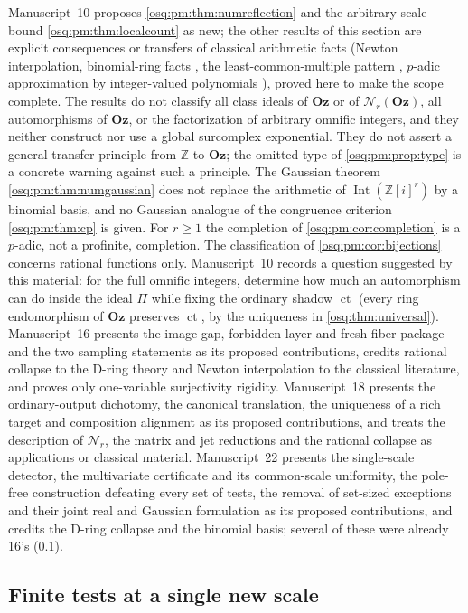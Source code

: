 \documentclass[11pt,letterpaper]{article}
\numberwithin{equation}{section}
\theoremstyle{definition}
\theoremstyle{remark}
\theoremstyle{plain}
\newcommand{\Oz}{\mathbf{Oz}}
\newcommand{\Z}{\mathbb Z}
\newcommand{\ct}{\operatorname{ct}}
\newcommand{\Int}{\operatorname{Int}}
\newcommand{\Num}{\mathscr N}
\begin{document}
Manuscript~10 proposes \cref{osq:pm:thm:numreflection} and the arbitrary-scale bound
\cref{osq:pm:thm:localcount} as new; the other results of this section are explicit
consequences or transfers of classical arithmetic facts (Newton interpolation,
binomial-ring facts \cite{ElliottBinomial}, the least-common-multiple pattern \cite{CGG},
$p$-adic approximation by integer-valued polynomials \cite{CC}), proved here to make the
scope complete. The results do not classify all class ideals of $\Oz$ or of
$\Num_r(\Oz)$, all automorphisms of $\Oz$, or the factorization of arbitrary omnific
integers, and they neither construct nor use a global surcomplex exponential. They do not
assert a general transfer principle from $\Z$ to $\Oz$; the omitted type of
\cref{osq:pm:prop:type} is a concrete warning against such a principle. The Gaussian
theorem \cref{osq:pm:thm:numgaussian} does not replace the arithmetic of $\Int(\Z[i]^r)$
by a binomial basis, and no Gaussian analogue of the congruence criterion
\cref{osq:pm:thm:cp} is given. For $r\ge1$ the completion of
\cref{osq:pm:cor:completion} is a $p$-adic, not a profinite, completion. The
classification of \cref{osq:pm:cor:bijections} concerns rational functions only.
Manuscript~10 records a question suggested by this material: for the full omnific
integers, determine how much an automorphism can do inside the ideal $\Pi$ while fixing
the ordinary shadow $\ct$ (every ring endomorphism of $\Oz$ preserves $\ct$, by the
uniqueness in \cref{osq:thm:universal}). Manuscript~16 presents the image-gap, forbidden-layer and fresh-fiber
package and the two sampling statements as its proposed contributions, credits rational collapse to the D-ring
theory and Newton interpolation to the classical literature, and proves only one-variable surjectivity rigidity.
Manuscript~18 presents the ordinary-output dichotomy, the canonical translation, the uniqueness of a rich target and
composition alignment as its proposed contributions, and treats the description of $\Num_r$, the matrix and jet
reductions and the rational collapse as applications or classical material. Manuscript~22 presents the single-scale detector, the
multivariate certificate and its common-scale uniformity, the pole-free construction defeating every set of tests, the removal of set-sized
exceptions and their joint real and Gaussian formulation as its proposed contributions, and credits the D-ring collapse and the binomial basis;
several of these were already 16's (\cref{osq:ft:sub:tests}).

\subsection{Finite tests at a single new scale}\label{osq:ft:sub:tests}
\end{document}
